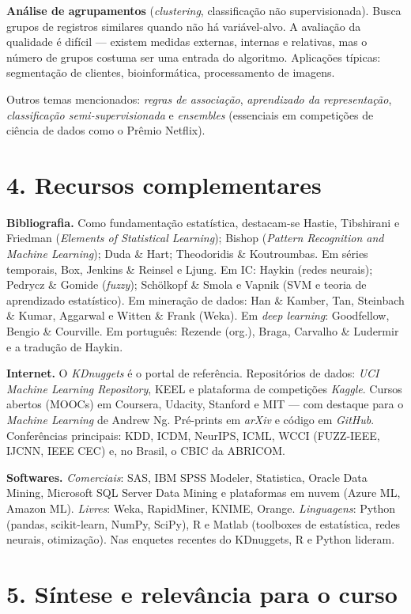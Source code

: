 \documentclass[11pt,a4paper]{article}
\begin{document}
\textbf{Análise de agrupamentos} (\emph{clustering}, classificação não supervisionada).
Busca grupos de registros similares quando não há variável-alvo. A avaliação da
qualidade é difícil --- existem medidas externas, internas e relativas, mas o número de
grupos costuma ser uma entrada do algoritmo. Aplicações típicas: segmentação de
clientes, bioinformática, processamento de imagens.

Outros temas mencionados: \emph{regras de associação}, \emph{aprendizado da
representação}, \emph{classificação semi-supervisionada} e \emph{ensembles} (essenciais
em competições de ciência de dados como o Prêmio Netflix).

\section*{4. Recursos complementares}

\textbf{Bibliografia.} Como fundamentação estatística, destacam-se Hastie, Tibshirani
e Friedman (\emph{Elements of Statistical Learning}); Bishop (\emph{Pattern Recognition
and Machine Learning}); Duda \& Hart; Theodoridis \& Koutroumbas. Em séries temporais,
Box, Jenkins \& Reinsel e Ljung. Em IC: Haykin (redes neurais); Pedrycz \& Gomide
(\emph{fuzzy}); Schölkopf \& Smola e Vapnik (SVM e teoria de aprendizado estatístico).
Em mineração de dados: Han \& Kamber, Tan, Steinbach \& Kumar, Aggarwal e Witten \&
Frank (Weka). Em \emph{deep learning}: Goodfellow, Bengio \& Courville. Em português:
Rezende (org.), Braga, Carvalho \& Ludermir e a tradução de Haykin.

\textbf{Internet.} O \emph{KDnuggets} é o portal de referência. Repositórios de dados:
\emph{UCI Machine Learning Repository}, KEEL e plataforma de competições \emph{Kaggle}.
Cursos abertos (MOOCs) em Coursera, Udacity, Stanford e MIT --- com destaque para o
\emph{Machine Learning} de Andrew Ng. Pré-prints em \emph{arXiv} e código em
\emph{GitHub}. Conferências principais: KDD, ICDM, NeurIPS, ICML, WCCI (FUZZ-IEEE,
IJCNN, IEEE CEC) e, no Brasil, o CBIC da ABRICOM.

\textbf{Softwares.} \emph{Comerciais}: SAS, IBM SPSS Modeler, Statistica, Oracle Data
Mining, Microsoft SQL Server Data Mining e plataformas em nuvem (Azure ML, Amazon ML).
\emph{Livres}: Weka, RapidMiner, KNIME, Orange. \emph{Linguagens}: Python (pandas,
scikit-learn, NumPy, SciPy), R e Matlab (toolboxes de estatística, redes neurais,
otimização). Nas enquetes recentes do KDnuggets, R e Python lideram.

\section*{5. Síntese e relevância para o curso}
\end{document}
